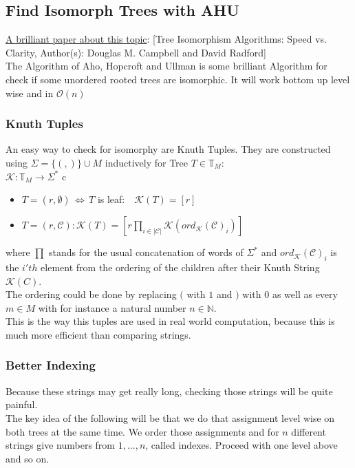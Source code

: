 \documentclass[a4paper,12pt]{article}
\theoremstyle{definition}
\begin{document}
	\subsection{Find Isomorph Trees with AHU}
	\hyperlink{www.jstor.org/stable/pdf/2690833.pdf}{A brilliant paper about this topic}: [Tree Isomorphism Algorithms: Speed vs. Clarity,\quad
	Author(s): Douglas M. Campbell and David Radford]\\
	The Algorithm of Aho, Hopcroft and Ullman is some brilliant Algorithm for check if some unordered rooted trees are isomorphic. It will work bottom up level wise and in $\mathcal{O}(n)$
	\subsubsection{Knuth Tuples}
	An easy way to check for isomorphy are Knuth Tuples. They are constructed using $\Sigma =\{(,)\}\cup M$ inductively for Tree $T\in \mathds{T}_M$:\\
	$\mathcal{K}: \mathds{T}_M \longrightarrow \Sigma^*$
	c\begin{itemize}
		\item $T=(r,\emptyset)\,\Leftrightarrow\, T$  is leaf:$\quad \mathcal{K} (T) =[r]$
		\item $T=(r,\mathcal{C}): \mathcal{K}(T)=[r \prod_{i\in |\mathcal{C}|} \mathcal K(ord_{\mathcal{K}}(\mathcal{C})_i)]$
	\end{itemize}
	where $\prod$ stands for the usual concatenation of words of $\Sigma^*$ and $ord_{\mathcal{K}}(\mathcal{C})_i$ is the $i'th$ element from the ordering of the children after their Knuth String $\mathcal{K}(C)$.\\
	The ordering could be done by replacing $($ with $1$ and $)$ with $0$ as well as every $m\in M$ with for instance a natural number $n\in \mathds{N}$.\\
	This is the way this tuples are used in real world computation, because this is much more efficient than comparing strings.
	\subsubsection{Better Indexing}
	Because these strings may get really long, checking those strings will be quite painful.\\
	The key idea of the following will be that we do that assignment level wise on both trees at the same time. We order those assignments and for $n$ different strings give numbers from $1,...,n$, called indexes. Proceed with one level above and so on.
\end{document}
